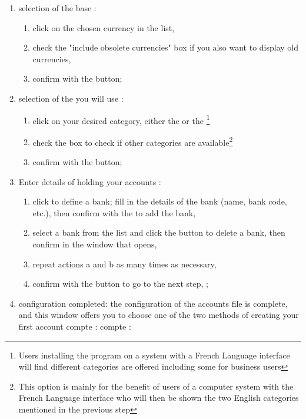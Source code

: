 \begin{enumerate}
\item selection of the base  :
\begin{enumerate} 
 \item click on the chosen currency in the list,
\item check the "include obsolete currencies" box if you also want to display old currencies,
\item confirm with the  button;
\end{enumerate}

\item selection of the   you will use :
\begin{enumerate} 
 \item click on your desired category, either the  or the  \footnote{ Users installing the program on a system with a French Language interface will find different categories are offered including some for business users} 
\item check the  box to check if other categories are available\footnote{ This option is mainly for the benefit of users of a computer system with the French Language interface who will then be shown the two English categories mentioned in the previous step}
\item confirm with the  button;
\end{enumerate}

\item Enter details of  holding your accounts :
\begin{enumerate} 
 \item click   to define a bank; fill in the details of the bank (name, bank code, etc.), then confirm with the  to add the bank,
\item select a bank from the list and click the  button to delete a bank, then confirm in the window that opens,
\item repeat actions a and b as many times as necessary,
\item  confirm with the   button to go to the next step,  ;
\end{enumerate} 

\item configuration completed: the configuration of the accounts file is complete, and this window offers you to choose one of the two methods of creating your first account
\ifIllustration compte :
\else compte :
\fi


\end{enumerate}
